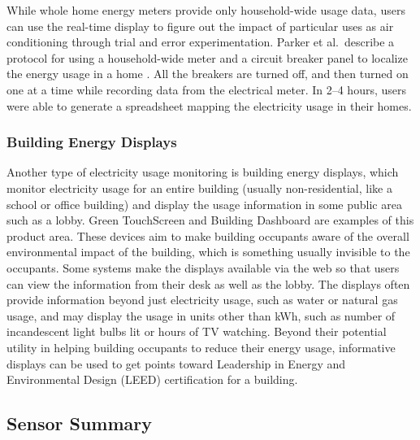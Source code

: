 While whole home energy meters provide only household-wide usage data, users can use the real-time display to figure out the impact of particular uses as air conditioning through trial and error experimentation. Parker et al.\ describe a protocol for using a household-wide meter and a circuit breaker panel to localize the energy usage in a home \cite{Parker2006How-Much-Energy}. All the breakers are turned off, and then turned on one at a time while recording data from the electrical meter. In 2--4 hours, users were able to generate a spreadsheet mapping the electricity usage in their homes.

\subsubsection{Building Energy Displays}
\label{sec:building-energy-displays}

Another type of electricity usage monitoring is building energy displays, which monitor electricity usage for an entire building (usually non-residential, like a school or office building) and display the usage information in some public area such as a lobby. Green TouchScreen \cite{greentouchscreen} and Building Dashboard \cite{building-dashboard} are examples of this product area. These devices aim to make building occupants aware of the overall environmental impact of the building, which is something usually invisible to the occupants. Some systems make the displays available via the web so that users can view the information from their desk as well as the lobby. The displays often provide  information beyond just electricity usage, such as water or natural gas usage, and may display the usage in units other than kWh, such as number of incandescent light bulbs lit or hours of TV watching. Beyond their potential utility in helping building occupants to reduce their energy usage, informative displays can be used to get points toward Leadership in Energy and Environmental Design (LEED) certification for a building.

\subsection{Sensor Summary}

